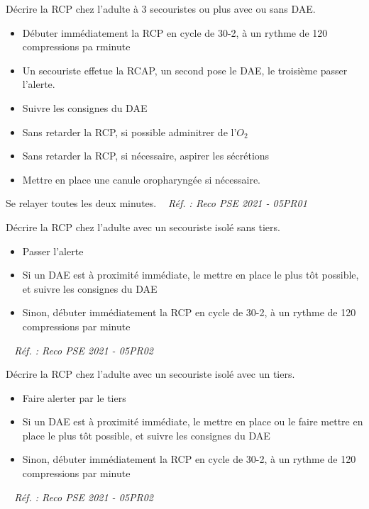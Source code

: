 \documentclass[grid,avery5371,landscape]{flashcards}
\makeatletter
\newcounter{nocarte}
\newcommand{\categ}[1]{%
  \def\@categ{#1}%
  \setcounter{nocarte}{0}%
}
\newcommand{\source}[1]{%
  \medskip
  \itshape%
   ~ \hfill Réf. : #1}
\makeatother
\begin{document}
\color[HTML]{003273}
\categ{PSE}
\begin{flashcard}[CAT]{
 Décrire la RCP chez l'adulte à 3 secouristes ou plus avec ou sans DAE.   }
  \begin{itemize} \item Débuter immédiatement la RCP en cycle de 30-2, à un rythme de 120 compressions pa rminute \item Un secouriste effetue la RCAP, un second pose le DAE, le troisième passer l'alerte. \item Suivre les consignes du DAE \item Sans retarder la RCP, si possible adminitrer de l'$O_2$ \item Sans retarder la RCP, si nécessaire, aspirer les sécrétions \item Mettre en place une canule oropharyngée si nécessaire. \end{itemize} Se relayer toutes les deux minutes.
  \source{Reco PSE 2021 - 05PR01}
\end{flashcard}


\color[HTML]{003273}
\categ{PSE}
\begin{flashcard}[CAT]{
 Décrire la RCP chez l'adulte avec un secouriste isolé sans tiers.   }
  \begin{itemize} \item Passer l'alerte \item Si un DAE est à proximité immédiate, le mettre en place le plus tôt possible, et suivre les consignes du DAE \item Sinon, débuter immédiatement la RCP en cycle de 30-2, à un rythme de 120 compressions par minute  \end{itemize} 
  \source{Reco PSE 2021 - 05PR02}
\end{flashcard}


\color[HTML]{003273}
\categ{PSE}
\begin{flashcard}[CAT]{
 Décrire la RCP chez l'adulte avec un secouriste isolé avec un tiers.   }
  \begin{itemize} \item Faire alerter par le tiers \item Si un DAE est à proximité immédiate, le mettre en place ou le faire mettre en place le plus tôt possible, et suivre les consignes du DAE \item Sinon, débuter immédiatement la RCP en cycle de 30-2, à un rythme de 120 compressions par minute  \end{itemize} 
  \source{Reco PSE 2021 - 05PR02}
\end{flashcard}
\end{document}
